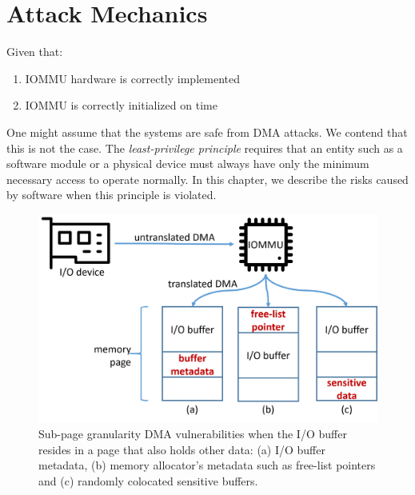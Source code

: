 \section{Attack Mechanics}
Given that:
\begin{enumerate}
    \item IOMMU hardware is correctly implemented 
    \item IOMMU is correctly initialized on time
\end{enumerate}
One might assume that the systems are safe from DMA attacks. We contend that this is not the case. The \textit{least-privilege principle} requires that an entity such as a software module or a physical device must always have only the minimum necessary access to operate normally. In this chapter, we describe the risks caused by software when this principle is violated.
\begin{figure}[t]
    \centering
    \includegraphics[width=1\columnwidth]{figs/colocation.png}
    \caption{Sub-page granularity DMA vulnerabilities when the I/O buffer resides in
a page that also holds other data: (a) I/O buffer metadata, (b) memory allocator’s
metadata such as free-list pointers and (c) randomly colocated sensitive buffers.}
    \label{fig:colocation}
\end{figure}
